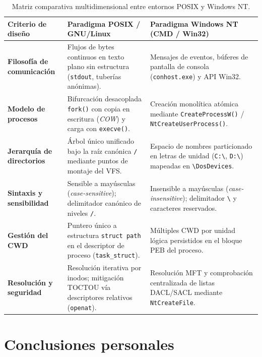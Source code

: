 \documentclass[12pt]{article}
\begin{document}
\begin{table}[htbp]
\centering
\footnotesize
\renewcommand{\arraystretch}{1.08}
\renewcommand{\tabularxcolumn}[1]{m{#1}}
\setlength{\emergencystretch}{1.5em}
\caption{Matriz comparativa multidimensional entre entornos POSIX y Windows NT.}
\label{tab:matrizComparativaEntornos}
\begin{tabularx}{\textwidth}{>{\centering\arraybackslash}m{2.6cm} X X}
\toprule
\textbf{Criterio de diseño} & \textbf{Paradigma POSIX / GNU/Linux} & \textbf{Paradigma Windows NT (CMD / Win32)} \\
\midrule
\textbf{Filosofía de comunicación} & Flujos de bytes continuos en texto plano sin estructura (\texttt{stdout}, tuberías anónimas). & Mensajes de eventos, búferes de pantalla de consola (\texttt{conhost.exe}) y API Win32. \\
\addlinespace
\textbf{Modelo de procesos} & Bifurcación desacoplada \texttt{fork()} con copia en escritura (\textit{COW}) y carga con \texttt{execve()}. & Creación monolítica atómica mediante \texttt{CreateProcessW()} / \texttt{NtCreateUserProcess()}. \\
\addlinespace
\textbf{Jerarquía de directorios} & Árbol único unificado bajo la raíz canónica \texttt{/} mediante puntos de montaje del VFS. & Espacio de nombres particionado en letras de unidad (\texttt{C:\textbackslash}, \texttt{D:\textbackslash}) mapeadas en \texttt{\textbackslash DosDevices}. \\
\addlinespace
\textbf{Sintaxis y sensibilidad} & Sensible a mayúsculas (\textit{case-sensitive}); delimitador canónico de niveles \texttt{/}. & Insensible a mayúsculas (\textit{case-insensitive}); delimitador \texttt{\textbackslash} y caracteres reservados. \\
\addlinespace
\textbf{Gestión del CWD} & Puntero único a estructura \texttt{struct path} en el descriptor de proceso (\texttt{task\_struct}). & Múltiples CWD por unidad lógica persistidos en el bloque PEB del proceso. \\
\addlinespace
\textbf{Resolución y seguridad} & Resolución iterativa por inodos; mitigación TOCTOU vía descriptores relativos (\texttt{openat}). & Resolución MFT y comprobación centralizada de listas DACL/SACL mediante \texttt{NtCreateFile}. \\
\bottomrule
\end{tabularx}
\end{table}

\section{Conclusiones personales}
\label{sec:conclusionesPersonales}
\end{document}
